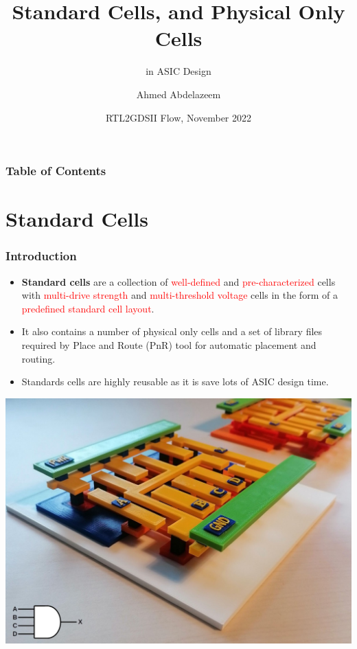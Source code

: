 \documentclass{beamer}
\title[Standard Cell] %
{Standard Cells, and Physical Only Cells }
\subtitle{in ASIC Design}
\author[Ahmed Abdelazeem] %
{Ahmed Abdelazeem}
\institute[ZU] %
{
	Faculty of Engineering\\
	Zagazig University
}
\date[ZU 2023] %
{RTL2GDSII Flow, November 2022}
\begin{document}
	
	\frame{\titlepage}
	
	
	\begin{frame}
		\frametitle{Table of Contents}
		\tableofcontents
	\end{frame}
	
	
	\section{Standard Cells}
	
	\begin{frame}
		\frametitle{Introduction}
		\begin{itemize}
			\item \textbf{Standard cells} are a collection of \textcolor {red} {well-defined} and \textcolor {red} {pre-characterized} cells with \textcolor {red} {multi-drive strength} and \textcolor {red} {multi-threshold voltage} cells in the form of a \textcolor {red} {predefined standard cell layout}. 
			\item It also contains a number of physical only cells and a set of library files required by Place and Route (PnR) tool for automatic placement and routing.
			\item Standards cells are highly reusable as it is save lots of ASIC design time.
		\end{itemize}
	\begin{center}
	\includegraphics[width=0.4 \textwidth]{3d_and.jpeg}
	\end{center}
	\end{frame}
	
	
\end{document}
